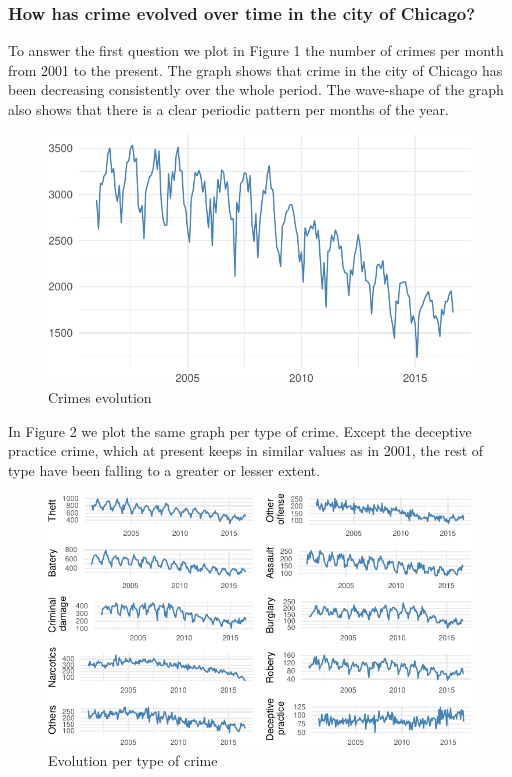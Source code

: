 \documentclass[]{article}
\begin{document}
\subsubsection{How has crime evolved over time in the city of
Chicago?}\label{how-has-crime-evolved-over-time-in-the-city-of-chicago}

To answer the first question we plot in Figure 1 the number of crimes
per month from 2001 to the present. The graph shows that crime in the
city of Chicago has been decreasing consistently over the whole period.
The wave-shape of the graph also shows that there is a clear periodic
pattern per months of the year.

\begin{figure}[htbp]
\centering
\includegraphics{Assessment_1v11_files/figure-latex/fig-1.pdf}
\caption{Crimes evolution}
\end{figure}

In Figure 2 we plot the same graph per type of crime. Except the
deceptive practice crime, which at present keeps in similar values as in
2001, the rest of type have been falling to a greater or lesser extent.

\begin{figure}[H]

{\centering \includegraphics{Assessment_1v11_files/figure-latex/fig2-1} 

}

\caption{Evolution per type of crime}\label{fig:fig2}
\end{figure}
\end{document}
